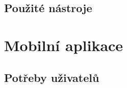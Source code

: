 \subsection{Použité nástroje}



\section{Mobilní aplikace}
\subsection{Potřeby uživatelů}
% 
% 
% 

